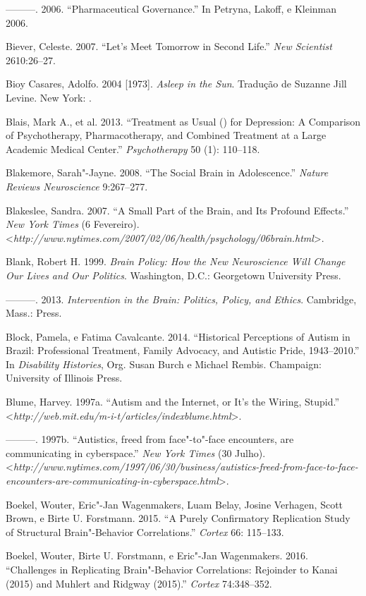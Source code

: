 ---------. 2006. ``Pharmaceutical Governance.'' In Petryna, Lakoff, e
Kleinman 2006.

Biever, Celeste. 2007. ``Let's Meet Tomorrow in Second Life.'' \emph{New
Scientist} 2610:26--27.

Bioy Casares, Adolfo. 2004 {[}1973{]}. \emph{Asleep in the Sun}.
Tradução de Suzanne Jill Levine. New York: .

Blais, Mark A., et al. 2013. ``Treatment as Usual () for Depression:
A Comparison of Psychotherapy, Pharmacotherapy, and Combined Treatment
at a Large Academic Medical Center.'' \emph{Psychotherapy} 50 (1):
110--118.

Blakemore, Sarah"-Jayne. 2008. ``The Social Brain in Adolescence.''
\emph{Nature Reviews Neuroscience} 9:267--277.

Blakeslee, Sandra. 2007. ``A Small Part of the Brain, and Its Profound
Effects.'' \emph{New York Times} (6 Fevereiro).
\textless{}\emph{http://www.nytimes.com/2007/02/06/health/psychology/06brain.html}\textgreater{}.

Blank, Robert H. 1999. \emph{Brain Policy: How the New Neuroscience Will
Change Our Lives and Our Politics}. Washington, D.C.: Georgetown
University Press.

---------. 2013. \emph{Intervention in the Brain: Politics, Policy, and
Ethics}. Cambridge, Mass.:  Press.

Block, Pamela, e Fatima Cavalcante. 2014. ``Historical Perceptions of
Autism in Brazil: Professional Treatment, Family Advocacy, and Autistic
Pride, 1943--2010.'' In \emph{Disability Histories}, Org. Susan Burch e
Michael Rembis. Champaign: University of Illinois Press.

Blume, Harvey. 1997a. ``Autism and the Internet, or It's the Wiring,
Stupid.'' \textless{}\emph{http://web.mit.edu/m-i-t/articles/indexblume.html}\textgreater{}.

---------. 1997b. ``Autistics, freed from face"-to"-face encounters, are
communicating in cyberspace.'' \emph{New York Times} (30 Julho).
\textless{}\emph{http://www.nytimes.com/1997/06/30/business/autistics-freed-from-face-to-face-encounters-are-communicating-in-cyberspace.html}\textgreater{}.

Boekel, Wouter, Eric"-Jan Wagenmakers, Luam Belay, Josine Verhagen, Scott
Brown, e Birte U. Forstmann. 2015. ``A Purely Confirmatory Replication
Study of Structural Brain"-Behavior Correlations.'' \emph{Cortex} 66:
115--133.

Boekel, Wouter, Birte U. Forstmann, e Eric"-Jan Wagenmakers. 2016.
``Challenges in Replicating Brain"-Behavior Correlations: Rejoinder to
Kanai (2015) and Muhlert and Ridgway (2015).'' \emph{Cortex}
74:348--352.

